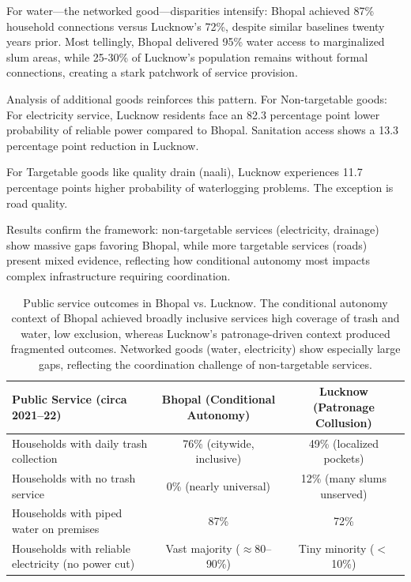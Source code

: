 For water—the networked good—disparities intensify: Bhopal achieved 87\% household connections versus Lucknow's 72\%, despite similar baselines twenty years prior. Most tellingly, Bhopal delivered 95\% water access to marginalized slum areas, while 25-30\% of Lucknow's population remains without formal connections, creating a stark patchwork of service provision.

Analysis of additional goods reinforces this pattern. For Non-targetable goods: For electricity service, Lucknow residents face an 82.3 percentage point lower probability of reliable power compared to Bhopal. Sanitation access shows a 13.3 percentage point reduction in Lucknow.

For Targetable goods like quality drain (naali), Lucknow experiences 11.7 percentage points higher probability of waterlogging problems. The exception is road quality.

Results confirm the framework: non-targetable services (electricity, drainage) show massive gaps favoring Bhopal, while more targetable services (roads) present mixed evidence, reflecting how conditional autonomy most impacts complex infrastructure requiring coordination.

\begin{table}[htbp]
\centering
\caption{Public service outcomes in Bhopal vs. Lucknow. The conditional autonomy context of Bhopal achieved broadly inclusive services high coverage of trash and water, low exclusion, whereas Lucknow's patronage-driven context produced fragmented outcomes. Networked goods (water, electricity) show especially large gaps, reflecting the coordination challenge of non-targetable services.}
\begin{tabular}{lcc}
\hline
\textbf{Public Service (circa 2021–22)} & \textbf{Bhopal (Conditional Autonomy)} & \textbf{Lucknow (Patronage Collusion)} \\
\hline
Households with daily trash collection & 76\% (citywide, inclusive) & 49\% (localized pockets) \\
\hline
Households with no trash service & 0\% (nearly universal) & 12\% (many slums unserved) \\
\hline
Households with piped water on premises & 87\% & 72\% \\
\hline
Households with reliable electricity (no power cut) & Vast majority ($\approx$80–90\%) & Tiny minority ($<$10\%) \\
\hline
\end{tabular}
\label{tab:services}
\end{table}


